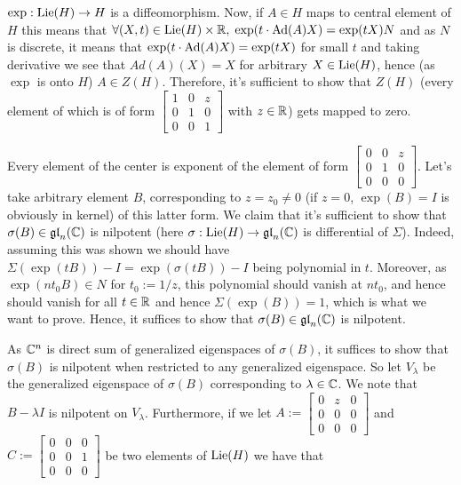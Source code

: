 \documentclass[8pt]{article} %
\newcommand{\Ad}{\mbox{\normalfont{Ad}}}
\newcommand{\Lie}{\mbox{\normalfont{Lie}}}
\begin{document}
$\exp:\Lie(H)\to H$ is a diffeomorphism.
Now, if $A\in H$ maps to central element
of $H$ this means that $\forall (X,t)\in \Lie(H)\times\R,\;\exp(t\cdot\Ad(A)X)=\exp(tX)N$ and as $N$ is discrete, it means that
$\exp(t\cdot\Ad(A)X)=\exp(tX)$ for small $t$ and taking derivative we see that $Ad(A)(X)=X$ for arbitrary $X\in\Lie(H)$,
hence (as $\exp$ is onto $H$) $A\in Z(H)$. Therefore, it's sufficient to show that $Z(H)$ (every element of which is of form
$\left[\begin{smallmatrix}1&0&z\\0&1&0\\0&0&1\end{smallmatrix}\right]$ with $z\in\mathbb{R}$) gets mapped to zero.\par
Every element of the center is exponent of the element of form $\left[\begin{smallmatrix}0&0&z\\0&1&0\\0&0&0\end{smallmatrix}\right]$.
Let's take arbitrary element $B$, corresponding to $z=z_0\neq0$ (if $z=0$, $\exp(B)=I$ is obviously in kernel)
of this latter form. We claim that it's sufficient to show that $\sigma(B)\in\mathfrak{gl}_n(\mathbb{C})$
is nilpotent (here $\sigma:\Lie(H)\to\mathfrak{gl}_n(\C)$ is differential of $\Sigma$). Indeed, assuming this was shown
we should have $\Sigma(\exp(tB))-I=\exp(\sigma(tB))-I$ being polynomial in $t$. Moreover, as $\exp(nt_0B)\in N$ for $t_0:=1/z$,
this polynomial should vanish at $nt_0$, and hence should vanish for all $t\in\mathbb{R}$ and hence $\Sigma(\exp(B))=1$, which is what we
want to prove. Hence, it suffices to show that $\sigma(B)\in\mathfrak{gl}_n(\mathbb{C})$ is nilpotent.\par
As $\mathbb{C}^n$ is direct sum of generalized eigenspaces of $\sigma(B)$, it suffices to show that $\sigma(B)$ is nilpotent when restricted
to any generalized eigenspace. 
So let $V_\lambda$ be the generalized eigenspace of $\sigma(B)$ corresponding to $\lambda\in\mathbb{C}$. We
note that $B-\lambda I$ is nilpotent on $V_\lambda$. Furthermore, if we let 
$A:=\left[\begin{smallmatrix}0&z&0\\0&0&0\\0&0&0\end{smallmatrix}\right]$ and 
$C:=\left[\begin{smallmatrix}0&0&0\\0&0&1\\0&0&0\end{smallmatrix}\right]$ be two elements of $\Lie(H)$ we have that
\end{document}
